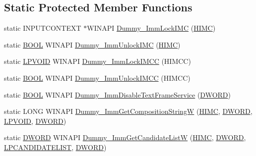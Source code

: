 \subsection*{Static Protected Member Functions}
\begin{DoxyCompactItemize}
\item 
static INPUTCONTEXT $\ast$WINAPI \hyperlink{class_c_d_x_u_t_i_m_e_edit_box_a0251f6c7891e81c331f93217805ef9c0}{Dummy\_\-ImmLockIMC} (\hyperlink{class_c_d_x_u_t_i_m_e_edit_box_aa9afdec726ecd526e2a0abc01537426c}{HIMC})
\item 
static \hyperlink{class_c_d_x_u_t_i_m_e_edit_box_ad2239c74ad7d59cbb8e6d2b5bf17bcb8}{BOOL} WINAPI \hyperlink{class_c_d_x_u_t_i_m_e_edit_box_a84759711c77bb12d6dbf10ce089e36c9}{Dummy\_\-ImmUnlockIMC} (\hyperlink{class_c_d_x_u_t_i_m_e_edit_box_aa9afdec726ecd526e2a0abc01537426c}{HIMC})
\item 
static \hyperlink{class_c_d_x_u_t_i_m_e_edit_box_a1fb0e05d8b96c531c1b69d06391b21f7}{LPVOID} WINAPI \hyperlink{class_c_d_x_u_t_i_m_e_edit_box_a3c14311c66c4a77d5b621192fe54f3b0}{Dummy\_\-ImmLockIMCC} (HIMCC)
\item 
static \hyperlink{class_c_d_x_u_t_i_m_e_edit_box_ad2239c74ad7d59cbb8e6d2b5bf17bcb8}{BOOL} WINAPI \hyperlink{class_c_d_x_u_t_i_m_e_edit_box_a5795f61c3458a7f260e6af8a874cc509}{Dummy\_\-ImmUnlockIMCC} (HIMCC)
\item 
static \hyperlink{class_c_d_x_u_t_i_m_e_edit_box_ad2239c74ad7d59cbb8e6d2b5bf17bcb8}{BOOL} WINAPI \hyperlink{class_c_d_x_u_t_i_m_e_edit_box_af417993379722080b7adbeaaef621d87}{Dummy\_\-ImmDisableTextFrameService} (\hyperlink{class_c_d_x_u_t_i_m_e_edit_box_a4666fce9b285d692ceb0515bf2dbde90}{DWORD})
\item 
static LONG WINAPI \hyperlink{class_c_d_x_u_t_i_m_e_edit_box_a45677be982c66ec3db85f619ebab910b}{Dummy\_\-ImmGetCompositionStringW} (\hyperlink{class_c_d_x_u_t_i_m_e_edit_box_aa9afdec726ecd526e2a0abc01537426c}{HIMC}, \hyperlink{class_c_d_x_u_t_i_m_e_edit_box_a4666fce9b285d692ceb0515bf2dbde90}{DWORD}, \hyperlink{class_c_d_x_u_t_i_m_e_edit_box_a1fb0e05d8b96c531c1b69d06391b21f7}{LPVOID}, \hyperlink{class_c_d_x_u_t_i_m_e_edit_box_a4666fce9b285d692ceb0515bf2dbde90}{DWORD})
\item 
static \hyperlink{class_c_d_x_u_t_i_m_e_edit_box_a4666fce9b285d692ceb0515bf2dbde90}{DWORD} WINAPI \hyperlink{class_c_d_x_u_t_i_m_e_edit_box_a76d4496d2c82e04f87b79a162c08de37}{Dummy\_\-ImmGetCandidateListW} (\hyperlink{class_c_d_x_u_t_i_m_e_edit_box_aa9afdec726ecd526e2a0abc01537426c}{HIMC}, \hyperlink{class_c_d_x_u_t_i_m_e_edit_box_a4666fce9b285d692ceb0515bf2dbde90}{DWORD}, \hyperlink{class_c_d_x_u_t_i_m_e_edit_box_aad569bc50d5e5e35422883375e07ff36}{LPCANDIDATELIST}, \hyperlink{class_c_d_x_u_t_i_m_e_edit_box_a4666fce9b285d692ceb0515bf2dbde90}{DWORD})

\end{DoxyCompactItemize}
